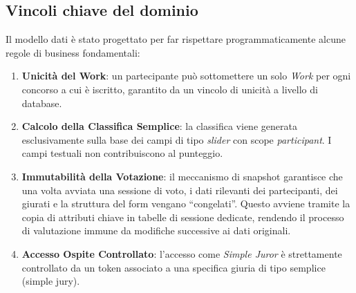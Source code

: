 \subsection{Vincoli chiave del dominio}\label{subsec:vincoli-chiave-del-dominio}
Il modello dati è stato progettato per far rispettare programmaticamente alcune regole di business fondamentali:
\begin{enumerate}
    \item \textbf{Unicità del Work}: un partecipante può sottomettere un solo \emph{Work} per ogni concorso a cui è iscritto, garantito da un vincolo di unicità a livello di database.
    \item \textbf{Calcolo della Classifica Semplice}: la classifica viene generata esclusivamente sulla base dei campi di tipo \emph{slider} con scope \emph{participant}.
    I campi testuali non contribuiscono al punteggio.
    \item \textbf{Immutabilità della Votazione}: il meccanismo di snapshot garantisce che una volta avviata una sessione di voto, i dati rilevanti dei partecipanti, dei giurati e la struttura del form vengano ``congelati''.
    Questo avviene tramite la copia di attributi chiave in tabelle di sessione dedicate, rendendo il processo di valutazione immune da modifiche successive ai dati originali.
    \item \textbf{Accesso Ospite Controllato}: l'accesso come \emph{Simple Juror} è strettamente controllato da un token associato a una specifica giuria di tipo semplice (simple jury).
\end{enumerate}
